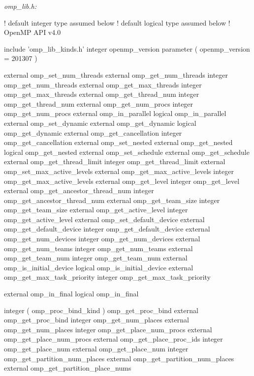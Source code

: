 \emph{omp\_lib.h:}

{\small \begin{codepar}
! default integer type assumed below
! default logical type assumed below
! OpenMP API v4.0

     include 'omp\_lib\_kinds.h'
     integer openmp\_version
     parameter ( openmp\_version = 201307 )

     external omp\_set\_num\_threads
     external omp\_get\_num\_threads
     integer omp\_get\_num\_threads
     external omp\_get\_max\_threads
     integer omp\_get\_max\_threads
     external omp\_get\_thread\_num
     integer omp\_get\_thread\_num
     external omp\_get\_num\_procs
     integer omp\_get\_num\_procs
     external omp\_in\_parallel
     logical omp\_in\_parallel
     external omp\_set\_dynamic
     external omp\_get\_dynamic
     logical omp\_get\_dynamic
     external omp\_get\_cancellation
     integer omp\_get\_cancellation
     external omp\_set\_nested
     external omp\_get\_nested
     logical omp\_get\_nested
     external omp\_set\_schedule
     external omp\_get\_schedule
     external omp\_get\_thread\_limit
     integer omp\_get\_thread\_limit
     external omp\_set\_max\_active\_levels
     external omp\_get\_max\_active\_levels
     integer omp\_get\_max\_active\_levels
     external omp\_get\_level
     integer omp\_get\_level
     external omp\_get\_ancestor\_thread\_num
     integer omp\_get\_ancestor\_thread\_num
     external omp\_get\_team\_size
     integer omp\_get\_team\_size
     external omp\_get\_active\_level
     integer omp\_get\_active\_level
     external omp\_set\_default\_device
     external omp\_get\_default\_device
     integer omp\_get\_default\_device
     external omp\_get\_num\_devices
     integer omp\_get\_num\_devices
     external omp\_get\_num\_teams
     integer omp\_get\_num\_teams
     external omp\_get\_team\_num
     integer omp\_get\_team\_num
     external omp\_is\_initial\_device
     logical omp\_is\_initial\_device
     external omp\_get\_max\_task\_priority
     integer omp\_get\_max\_task\_priority

     external omp\_in\_final
     logical omp\_in\_final

     integer ( omp\_proc\_bind\_kind ) omp\_get\_proc\_bind
     external omp\_get\_proc\_bind
     integer omp\_get\_num\_places
     external omp\_get\_num\_places
     integer omp\_get\_place\_num\_procs
     external omp\_get\_place\_num\_procs
     external omp\_get\_place\_proc\_ids
     integer omp\_get\_place\_num
     external omp\_get\_place\_num
     integer omp\_get\_partition\_num\_places
     external omp\_get\_partition\_num\_places
     external omp\_get\_partition\_place\_nums
     

\end{codepar}}
